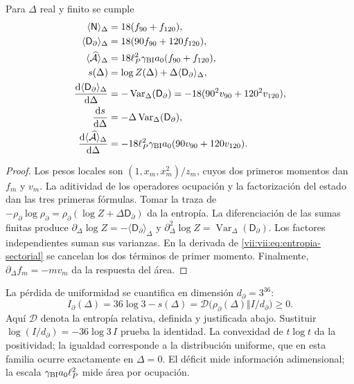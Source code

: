 \begin{proposition}
\label{vii:vii:prop:respuesta-sectorial}
Para \(\Delta\) real y finito se cumple
\begin{align}
 \langle\mathsf N\rangle_\Delta&=18(f_{90}+f_{120}),\\
 \langle\mathsf D_\partial\rangle_\Delta&=18(90f_{90}+120f_{120}),\\
 \langle\widehat{\mathcal A}\rangle_\Delta
 &=18\ell_P^2\gamma_{\rm BI}a_0(f_{90}+f_{120}),\\
 s(\Delta)&=\log Z(\Delta)+\Delta\langle\mathsf D_\partial\rangle_\Delta,
 \label{vii:vii:eq:entropia-sectorial}\\
 \frac{\mathrm d\langle\mathsf D_\partial\rangle_\Delta}{\mathrm d\Delta}
 &=-\operatorname{Var}_\Delta(\mathsf D_\partial)
  =-18(90^2v_{90}+120^2v_{120}),\\
 \frac{\mathrm ds}{\mathrm d\Delta}
 &=-\Delta\operatorname{Var}_\Delta(\mathsf D_\partial),\\
 \frac{\mathrm d\langle\widehat{\mathcal A}\rangle_\Delta}{\mathrm d\Delta}
 &=-18\ell_P^2\gamma_{\rm BI}a_0(90v_{90}+120v_{120}).
 \label{vii:vii:eq:respuestas-area-entropia}
\end{align}
\end{proposition}
\begin{proof}
Los pesos locales son \((1,x_m,x_m^2)/z_m\), cuyos dos primeros
momentos dan \(f_m\) y \(v_m\). La aditividad de los operadores
ocupación y la factorización del estado dan las tres primeras fórmulas.
Tomar la traza de
\(-\rho_\partial\log\rho_\partial
=\rho_\partial(\log Z+\Delta\mathsf D_\partial)\)
da la entropía. La diferenciación de las sumas finitas produce
\(\partial_\Delta\log Z=-\langle\mathsf D_\partial\rangle_\Delta\)
y \(\partial_\Delta^2\log Z
=\operatorname{Var}_\Delta(\mathsf D_\partial)\).
Los factores independientes suman sus varianzas. En la derivada de
\eqref{vii:vii:eq:entropia-sectorial} se cancelan los dos términos de
primer momento. Finalmente, \(\partial_\Delta f_m=-mv_m\)
da la respuesta del área.
\end{proof}

La pérdida de uniformidad se cuantifica en dimensión \(d_\partial=3^{36}\):
\begin{equation}
 I_\partial(\Delta)
 =36\log3-s(\Delta)
 =\mathcal D\bigl(\rho_\partial(\Delta)\Vert I/d_\partial\bigr)\ge0.
 \label{vii:vii:eq:deficit-informacional}
\end{equation}
Aquí \(\mathcal D\) denota la entropía relativa, definida y justificada
abajo. Sustituir \(\log(I/d_\partial)=-36\log3\,I\) prueba la
identidad. La convexidad de \(t\log t\) da la positividad; la igualdad
corresponde a la distribución uniforme, que en esta familia ocurre
exactamente en \(\Delta=0\). El déficit mide información adimensional;
la escala \(\gamma_{\rm BI}a_0\ell_P^2\) mide área por ocupación.

